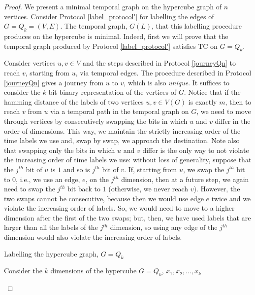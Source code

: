\documentclass[a4paper,UKenglish]{article}
\begin{document}
\begin{proof}
We present a minimal temporal graph on the hypercube graph of $n$ vertices. Consider Protocol \ref{label_protocol'} for labelling the edges of $G=Q_k=(V,E)$. The temporal graph, $G(L)$, that this labelling procedure produces on the hypercube is minimal. Indeed, first we will prove that the temporal graph produced by Protocol \ref{label_protocol'} satisfies TC on $G=Q_k$.

Consider vertices $u,v\in V$ and the steps described in Protocol \ref{journeyQn} to reach $v$, starting from $u$, via temporal edges. The procedure described in Protocol \ref{journeyQn} gives a journey from $u$ to $v$, which is also \emph{unique}. It suffices to consider the $k$-bit binary representation of the vertices of $G$. Notice that if the hamming distance of the labels of two vertices $u,v\in V(G)$ is exactly $m$, then to reach $v$ from $u$ via a temporal path in the temporal graph on $G$, we need to move through vertices by consecutively swapping the bits in which $u$ and $v$ differ in the order of dimensions. This way, we maintain the strictly increasing order of the time labels we use and, swap by swap, we approach the destination. Note also that swapping only the bits in which $u$ and $v$ differ is the only way to not violate the increasing order of time labels we use: without loss of generality, suppose that the $j^{th}$ bit of $u$ is $1$ and so is $j^{th}$ bit of $v$. If, starting from $u$, we swap the $j^{th}$ bit to $0$, i.e., we use an edge, $e$, on the $j^{th}$ dimension, then at a future step, we again need to swap the $j^{th}$ bit back to $1$ (otherwise, we never reach $v$). However, the two swaps cannot be consecutive, because then we would use edge $e$ twice and we violate the increasing order of labels. So, we would need to move to a higher dimension after the first of the two swaps; but, then, we have used labels that are larger than all the labels of the $j^{th}$ dimension, so using any edge of the $j^{th}$ dimension would also violate the increasing order of labels.
\begin{algorithm}[ht]
\caption{Labelling the hypercube graph, $G=Q_k$}
\label{label_protocol'}
\SetAlgoLined

	Consider the $k$ dimensions of the hypercube $G=Q_k$, $x_1,x_2,\ldots,x_k$\;
\end{algorithm}


\end{proof}
\end{document}
